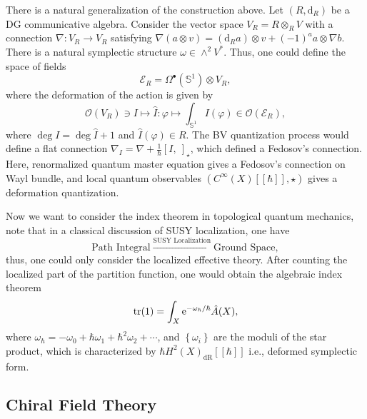 \documentclass[10pt]{article}
\begin{document}
There is a natural generalization of the construction above.
Let $\left( R, \mathrm{d} _{R} \right)$ be a DG communicative algebra. Consider the vector space $ V_{R} = R \otimes _{R} V$ with a connection $ \nabla : V_{R} \rightarrow V_{R}$ satisfying $ \nabla (a \otimes v) = \left( \mathrm{d} _{R} a \right) \otimes v + (-1)^{a} a \otimes \nabla b$.
There is a natural symplectic structure $ \omega \in \wedge^{2} V^{*}$.
Thus, one could define the space of fields
\begin{equation*}
  \mathcal{E}_{R} = \Omega^{\bullet}(\mathbb{S}^{1}) \otimes V_{R},
\end{equation*}
where the deformation of the action is given by
\begin{equation*}
  \mathcal{O}(V_{R}) \ni I \mapsto \hat{I}: \varphi \mapsto \int _{\mathbb{S}^{1}} I(\varphi) \in \mathcal{O}(\mathcal{E}_{R}),
\end{equation*}
where $\deg I = \deg \hat{I} + 1$ and $ \hat{I}(\varphi) \in R$.
The BV quantization process would define a flat connection $ \nabla_{I} = \nabla + \frac{1}{\hbar}[I, ~]_{\star}$, which defined a Fedosov's connection.
Here, renormalized quantum master equation gives a Fedosov's connection on Wayl bundle, and local quantum observables $\left( C^{\infty }(X)[[\hbar]], \star \right)$ gives a deformation quantization.

Now we want to consider the index theorem in topological quantum mechanics, note that in a classical discussion of SUSY localization, one have
\begin{equation*}
  \text{Path Integral} \xrightarrow{\text{SUSY Localization}} \text{Ground Space},
\end{equation*}
thus, one could only consider the localized effective theory. After counting the localized part of the partition function, one would obtain the algebraic index theorem
\begin{equation*}
  \tr (1) = \int _{X} \mathrm{e}^{- \omega_{\hbar} / \hbar} \hat{A}(X),
\end{equation*}
where $ \omega_{\hbar} = - \omega_0 + \hbar \omega_1 + \hbar^{2} \omega_2 + \cdots $, and $\left\{ \omega_{i}\right\}$ are the moduli of the star product, which is characterized by $ \hbar H^{2}(X)_{\mathrm{dR}}[[\hbar]]$ i.e., deformed symplectic form.

\subsection{Chiral Field Theory}
\end{document}

